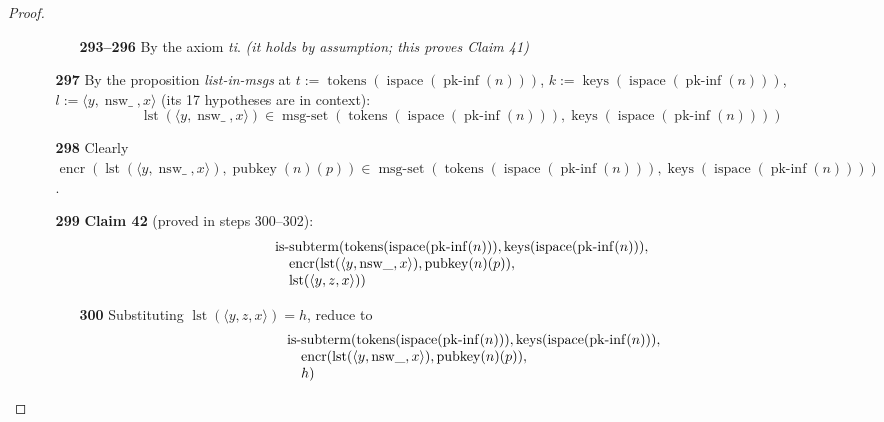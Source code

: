\documentclass[11pt]{article}
\theoremstyle{plain}
\begin{document}
\begin{proof}
\begin{itemize}[leftmargin=2.8em, itemsep=4pt, parsep=1pt]
\begin{itemize}[leftmargin=2.8em, itemsep=4pt, parsep=1pt]
  \begin{itemize}[leftmargin=2.8em, itemsep=4pt, parsep=1pt]
  \item[\textbf{293--296}] By the axiom \emph{ti}.  \emph{(it holds by assumption; this proves Claim 41)}
  \end{itemize}
  \item[\textbf{297}] By the proposition \emph{list-in-msgs} at $t := \operatorname{tokens}(\operatorname{ispace}(\operatorname{pk\text{-}inf}(n)))$, $k := \operatorname{keys}(\operatorname{ispace}(\operatorname{pk\text{-}inf}(n)))$, $l := \langle y, \operatorname{nsw\_}, x \rangle$ (its 17 hypotheses are in context):
\begin{equation*}
\operatorname{lst}(\langle y, \operatorname{nsw\_}, x \rangle) \in \operatorname{msg\text{-}set}(\operatorname{tokens}(\operatorname{ispace}(\operatorname{pk\text{-}inf}(n))), \operatorname{keys}(\operatorname{ispace}(\operatorname{pk\text{-}inf}(n))))
\end{equation*}

  \item[\textbf{298}] Clearly $\operatorname{encr}(\operatorname{lst}(\langle y, \operatorname{nsw\_}, x \rangle), \operatorname{pubkey}(n)(p)) \in \operatorname{msg\text{-}set}(\operatorname{tokens}(\operatorname{ispace}(\operatorname{pk\text{-}inf}(n))), \operatorname{keys}(\operatorname{ispace}(\operatorname{pk\text{-}inf}(n))))$.
  \item[\textbf{299}] \textbf{Claim 42} (proved in steps 300--302):
\begin{equation*}
\begin{array}{@{}l@{}} \operatorname{is\text{-}subterm}(\operatorname{tokens}(\operatorname{ispace}(\operatorname{pk\text{-}inf}(n))), \operatorname{keys}(\operatorname{ispace}(\operatorname{pk\text{-}inf}(n))), \\ \quad \operatorname{encr}(\operatorname{lst}(\langle y, \operatorname{nsw\_}, x \rangle), \operatorname{pubkey}(n)(p)), \\ \quad \operatorname{lst}(\langle y, z, x \rangle)) \end{array}
\end{equation*}

  \begin{itemize}[leftmargin=2.8em, itemsep=4pt, parsep=1pt]
  \item[\textbf{300}] Substituting $\operatorname{lst}(\langle y, z, x \rangle) = h$, reduce to
\begin{equation*}
\begin{array}{@{}l@{}} \operatorname{is\text{-}subterm}(\operatorname{tokens}(\operatorname{ispace}(\operatorname{pk\text{-}inf}(n))), \operatorname{keys}(\operatorname{ispace}(\operatorname{pk\text{-}inf}(n))), \\ \quad \operatorname{encr}(\operatorname{lst}(\langle y, \operatorname{nsw\_}, x \rangle), \operatorname{pubkey}(n)(p)), \\ \quad h) \end{array}
\end{equation*}


\end{itemize}
\end{itemize}
\end{itemize}
\end{proof}
\end{document}
